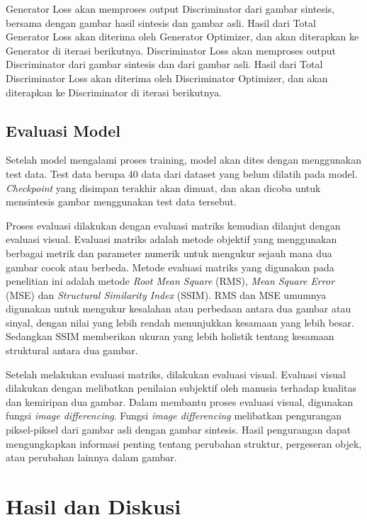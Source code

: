 \documentclass[conference]{IEEEtran}
\begin{document}
Generator Loss akan memproses output Discriminator dari gambar sintesis, bersama dengan gambar hasil sintesis dan gambar asli. 
Hasil dari Total Generator Loss akan diterima oleh Generator Optimizer, dan akan diterapkan ke Generator di iterasi berikutnya. 
Discriminator Loss akan memproses output Discriminator dari gambar sintesis dan dari gambar asli. 
Hasil dari Total Discriminator Loss akan diterima oleh Discriminator Optimizer, dan akan diterapkan ke Discriminator di iterasi berikutnya.

\subsection{Evaluasi Model}
Setelah model mengalami proses training, model akan dites dengan menggunakan test data. 
Test data berupa 40 data dari dataset yang belum dilatih pada model. 
\emph{Checkpoint} yang disimpan terakhir akan dimuat, dan akan dicoba untuk mensintesis gambar menggunakan test data tersebut. 

Proses evaluasi dilakukan dengan evaluasi matriks kemudian dilanjut dengan evaluasi visual. 
Evaluasi matriks adalah metode objektif yang menggunakan berbagai metrik dan parameter numerik untuk mengukur sejauh mana dua gambar cocok atau berbeda. 
Metode evaluasi matriks yang digunakan pada penelitian ini adalah metode \emph{Root Mean Square} (RMS), \emph{Mean Square Error} (MSE) dan \emph{Structural Similarity Index} (SSIM). 
RMS dan MSE umumnya digunakan untuk mengukur kesalahan atau perbedaan antara dua gambar atau sinyal, dengan nilai yang lebih rendah menunjukkan kesamaan yang lebih besar. 
Sedangkan SSIM memberikan ukuran yang lebih holistik tentang kesamaan struktural antara dua gambar.

Setelah melakukan evaluasi matriks, dilakukan evaluasi visual. 
Evaluasi visual dilakukan dengan melibatkan penilaian subjektif oleh manusia terhadap kualitas dan kemiripan dua gambar. 
Dalam membantu proses evaluasi visual, digunakan fungsi \emph{image differencing}. 
Fungsi \emph{image differencing} melibatkan pengurangan piksel-piksel dari gambar asli dengan gambar sintesis. 
Hasil pengurangan dapat mengungkapkan informasi penting tentang perubahan struktur, pergeseran objek, atau perubahan lainnya dalam gambar.

\section*{Hasil dan Diskusi}
\end{document}
